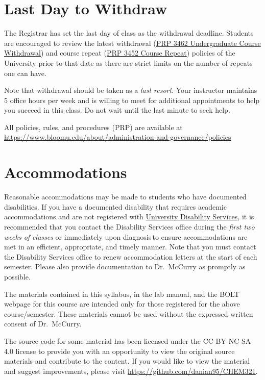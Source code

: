 \documentclass[11pt,letterpaper]{article}
\begin{document}
\section{Last Day to Withdraw}
The Registrar has set the last day of class as the withdrawal deadline.
Students are encouraged to review the latest withdrawal
(\href{https://www.bloomu.edu/prp-3462-undergraduate-course-withdrawal}{PRP 3462 Undergraduate
Course Withdrawal}) and course repeat
(\href{https://www.bloomu.edu/prp-3452-course-repeat}{PRP 3452 Course
Repeat}) policies of the
University prior to that date as there are strict limits on the number of
repeats one can have. 

Note that withdrawal should be taken as a \emph{last resort}. Your instructor
maintains 5 office hours per week and is willing to meet for additional
appointments to help you succeed in this class. Do not wait until the last minute to seek help.

\begin{mdframed}
	\centering
	All policies, rules, and procedures (PRP) are available at
	\url{https://www.bloomu.edu/about/administration-and-governance/policies}
\end{mdframed}

\section{Accommodations}
Reasonable accommodations may be made to students who have documented
disabilities. If you have a documented disability that requires academic
accommodations and are not registered with
\href{https://bloomu.prod.acquia-sites.com/offices-directory/disability-services}{University
Disability Services}, it is recommended that you contact the Disability Services office during
the \textit{first two weeks of classes} or immediately upon diagnosis to ensure
accommodations are met in an efficient, appropriate, and timely manner.
Note that you must contact the Disability Services office to renew accommodation
letters at the start of each semester. Please also provide documentation to Dr.\
McCurry as promptly as possible.

\vfill

\begin{mdframed}
	\noindent
	The materials contained in this syllabus, in the lab manual, and the
	BOLT webpage for this course are intended only for those registered for
	the above course/semester. These materials cannot be used without the
	expressed written consent of Dr.\ McCurry.

	\bigskip

	\noindent
	The source code for some material has been licensed under the CC
	BY-NC-SA 4.0 license to provide you with an opportunity to view the
	original source materials and contribute to the content. If you would
	like to view the material and suggest improvements, please visit
	\url{https://github.com/danian95/CHEM321}.
\end{mdframed}
\end{document}
